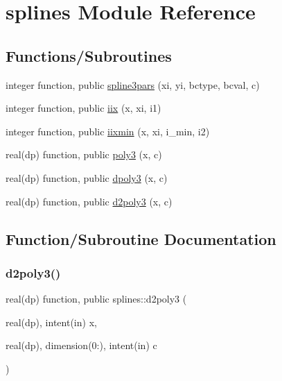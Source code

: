 \hypertarget{namespacesplines}{}\section{splines Module Reference}
\label{namespacesplines}
\subsection*{Functions/\+Subroutines}
\begin{DoxyCompactItemize}
\item 
integer function, public \hyperlink{namespacesplines_a05f420f0b3b0106002e125873e32f9f8}{spline3pars} (xi, yi, bctype, bcval, c)
\item 
integer function, public \hyperlink{namespacesplines_a0f964b42918aebb07ea640368240d3b3}{iix} (x, xi, i1)
\item 
integer function, public \hyperlink{namespacesplines_a150ebea82fdfc65f1928d6c8d0a249d5}{iixmin} (x, xi, i\+\_\+min, i2)
\item 
real(dp) function, public \hyperlink{namespacesplines_ac73e6ec2345cfda7cfa18da6c24be86d}{poly3} (x, c)
\item 
real(dp) function, public \hyperlink{namespacesplines_a61a0713641022429d90d94dbc683d16c}{dpoly3} (x, c)
\item 
real(dp) function, public \hyperlink{namespacesplines_a3c279dd01641afa904c481492a43fa39}{d2poly3} (x, c)
\end{DoxyCompactItemize}


\subsection{Function/\+Subroutine Documentation}
\mbox{\label{namespacesplines_a3c279dd01641afa904c481492a43fa39}} 
\subsubsection{\texorpdfstring{d2poly3()}{d2poly3()}}
{\footnotesize\ttfamily real(dp) function, public splines\+::d2poly3 (\begin{DoxyParamCaption}\item[{real(dp), intent(in)}]{x,  }\item[{real(dp), dimension(0\+:), intent(in)}]{c }\end{DoxyParamCaption})}



